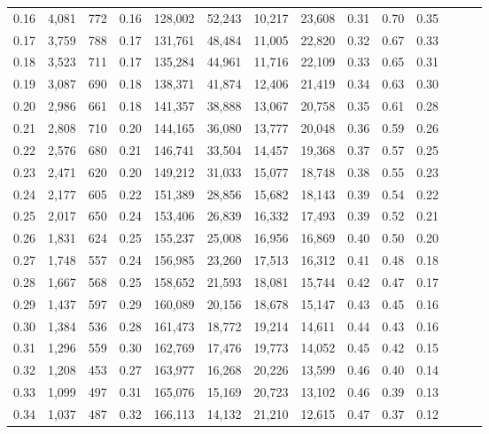 \begin{tabular}{rrrrrrrrrrrrrr}
0.16 &   4,081 &  772 &  0.16 &  128,002 &   52,243 &  10,217 &  23,608 &  0.31 &  0.70 &      0.35 \\
0.17 &   3,759 &  788 &  0.17 &  131,761 &   48,484 &  11,005 &  22,820 &  0.32 &  0.67 &      0.33 \\
0.18 &   3,523 &  711 &  0.17 &  135,284 &   44,961 &  11,716 &  22,109 &  0.33 &  0.65 &      0.31 \\
0.19 &   3,087 &  690 &  0.18 &  138,371 &   41,874 &  12,406 &  21,419 &  0.34 &  0.63 &      0.30 \\
0.20 &   2,986 &  661 &  0.18 &  141,357 &   38,888 &  13,067 &  20,758 &  0.35 &  0.61 &      0.28 \\
0.21 &   2,808 &  710 &  0.20 &  144,165 &   36,080 &  13,777 &  20,048 &  0.36 &  0.59 &      0.26 \\
0.22 &   2,576 &  680 &  0.21 &  146,741 &   33,504 &  14,457 &  19,368 &  0.37 &  0.57 &      0.25 \\
0.23 &   2,471 &  620 &  0.20 &  149,212 &   31,033 &  15,077 &  18,748 &  0.38 &  0.55 &      0.23 \\
0.24 &   2,177 &  605 &  0.22 &  151,389 &   28,856 &  15,682 &  18,143 &  0.39 &  0.54 &      0.22 \\
0.25 &   2,017 &  650 &  0.24 &  153,406 &   26,839 &  16,332 &  17,493 &  0.39 &  0.52 &      0.21 \\
0.26 &   1,831 &  624 &  0.25 &  155,237 &   25,008 &  16,956 &  16,869 &  0.40 &  0.50 &      0.20 \\
0.27 &   1,748 &  557 &  0.24 &  156,985 &   23,260 &  17,513 &  16,312 &  0.41 &  0.48 &      0.18 \\
0.28 &   1,667 &  568 &  0.25 &  158,652 &   21,593 &  18,081 &  15,744 &  0.42 &  0.47 &      0.17 \\
0.29 &   1,437 &  597 &  0.29 &  160,089 &   20,156 &  18,678 &  15,147 &  0.43 &  0.45 &      0.16 \\
0.30 &   1,384 &  536 &  0.28 &  161,473 &   18,772 &  19,214 &  14,611 &  0.44 &  0.43 &      0.16 \\
0.31 &   1,296 &  559 &  0.30 &  162,769 &   17,476 &  19,773 &  14,052 &  0.45 &  0.42 &      0.15 \\
0.32 &   1,208 &  453 &  0.27 &  163,977 &   16,268 &  20,226 &  13,599 &  0.46 &  0.40 &      0.14 \\
0.33 &   1,099 &  497 &  0.31 &  165,076 &   15,169 &  20,723 &  13,102 &  0.46 &  0.39 &      0.13 \\
0.34 &   1,037 &  487 &  0.32 &  166,113 &   14,132 &  21,210 &  12,615 &  0.47 &  0.37 &      0.12 \\

\end{tabular}
